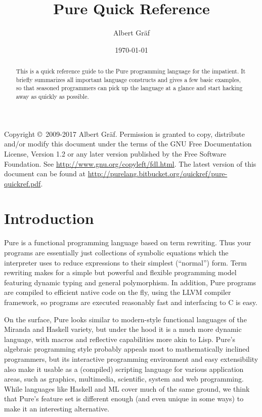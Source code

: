 \documentclass[a4paper,12pt]{article}
\title{\LARGE\usefont{OT1}{phv}{bc}{n} Pure Quick Reference}
\author{\large\usefont{OT1}{phv}{m}{n} Albert Gr\"af}
\date{\small\usefont{OT1}{phv}{mc}{n}\today}
\begin{document}
\maketitle

\begin{abstract}
This is a quick reference guide to the Pure programming language for the impatient. It briefly summarizes all important language constructs and gives a few basic examples, so that seasoned programmers can pick up the language at a glance and start hacking away as quickly as possible.
\end{abstract}

{\noindent\footnotesize Copyright \copyright\ 2009-2017 Albert Gr\"af. Permission is granted to copy, distribute and/or modify this document under the terms of the GNU Free Documentation License, Version 1.2 or any later version published by the Free Software Foundation. See \url{http://www.gnu.org/copyleft/fdl.html}. The latest version of this document can be found at \url{http://purelang.bitbucket.org/quickref/pure-quickref.pdf}.}

\tableofcontents


\section{Introduction}
\label{Introduction}

Pure is a functional programming language based on term rewriting. Thus your programs are essentially just collections of symbolic equations which the interpreter uses to reduce expressions to their simplest (``normal'') form. Term rewriting makes for a simple but powerful and flexible programming model featuring dynamic typing and general polymorphism. In addition, Pure programs are compiled to efficient native code on the fly, using the LLVM compiler framework, so programs are executed reasonably fast and interfacing to C is easy.

On the surface, Pure looks similar to modern-style functional languages of the Miranda and Haskell variety, but under the hood it is a much more dynamic language, with macros and reflective capabilities more akin to Lisp. Pure's algebraic programming style probably appeals most to mathematically inclined programmers, but its interactive programming environment and easy extensibility also make it usable as a (compiled) scripting language for various application areas, such as graphics, multimedia, scien\-ti\-fic, system and web programming. While languages like Haskell and ML cover much of the same ground, we think that Pure's feature set is different enough (and even unique in some ways) to make it an interesting alternative.
\end{document}
